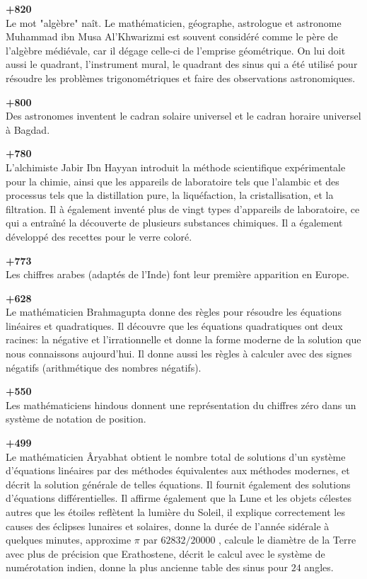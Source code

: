 \textbf{+820}\\
Le mot "algèbre" naît. Le mathématicien, géographe, astrologue et astronome Muhammad ibn Musa Al'Khwarizmi est souvent considéré comme le père de l'algèbre médiévale, car il dégage celle-ci de l'emprise géométrique. On lui doit aussi le quadrant, l'instrument mural, le quadrant des sinus qui a été utilisé pour résoudre les problèmes trigonométriques et faire des observations astronomiques.

\textbf{+800}\\
Des astronomes inventent le cadran solaire universel et le cadran horaire universel à Bagdad.

\textbf{+780}\\
L'alchimiste Jabir Ibn Hayyan introduit la méthode scientifique expérimentale pour la chimie, ainsi que les appareils de laboratoire tels que l'alambic et des processus tels que la distillation pure, la liquéfaction, la cristallisation, et la filtration. Il à également inventé plus de vingt types d'appareils de laboratoire, ce qui a entraîné la découverte de plusieurs substances chimiques. Il a également développé des recettes pour le verre coloré.

\textbf{+773}\\
Les chiffres arabes (adaptés de l'Inde) font leur première apparition en Europe.

\textbf{+628}\\
Le mathématicien Brahmagupta donne des règles pour résoudre les équations linéaires et quadratiques. Il découvre que les équations quadratiques ont deux racines: la négative et l'irrationnelle et donne la forme moderne de la solution que nous connaissons aujourd'hui. Il donne aussi les règles à calculer avec des signes négatifs (arithmétique des nombres négatifs).

\textbf{+550}\\
Les mathématiciens hindous donnent une représentation du chiffres zéro dans un système de notation de position.

\textbf{+499}\\
Le mathématicien Âryabhat obtient le nombre total de solutions d'un système d'équations linéaires par des méthodes équivalentes aux méthodes modernes, et décrit la solution générale de telles équations. Il fournit également des solutions d'équations différentielles. Il affirme également que la Lune et les objets célestes autres que les étoiles reflètent la lumière du Soleil, il explique correctement les causes des éclipses lunaires et solaires, donne la durée de l'année sidérale à quelques minutes, approxime $\pi$ par $62832/20000$ , calcule le diamètre de la Terre avec plus de précision que Erathostene, décrit le calcul avec le système de numérotation indien, donne la plus ancienne table des sinus pour $24$ angles.

